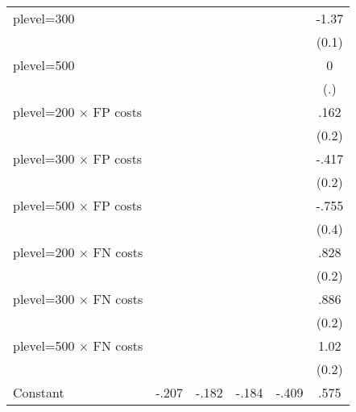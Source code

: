 \begin{table}[htbp]
\begin{tabular}{l*{5}{c}}
plevel=300      &                  &                  &                  &                  &    -1.37\sym{***}\\
                &                  &                  &                  &                  &    (0.1)         \\
plevel=500      &                  &                  &                  &                  &        0         \\
                &                  &                  &                  &                  &      (.)         \\
plevel=200 $\times$ FP costs&                  &                  &                  &                  &     .162         \\
                &                  &                  &                  &                  &    (0.2)         \\
plevel=300 $\times$ FP costs&                  &                  &                  &                  &    -.417\sym{***}\\
                &                  &                  &                  &                  &    (0.2)         \\
plevel=500 $\times$ FP costs&                  &                  &                  &                  &    -.755\sym{*}  \\
                &                  &                  &                  &                  &    (0.4)         \\
plevel=200 $\times$ FN costs&                  &                  &                  &                  &     .828\sym{***}\\
                &                  &                  &                  &                  &    (0.2)         \\
plevel=300 $\times$ FN costs&                  &                  &                  &                  &     .886\sym{***}\\
                &                  &                  &                  &                  &    (0.2)         \\
plevel=500 $\times$ FN costs&                  &                  &                  &                  &     1.02\sym{***}\\
                &                  &                  &                  &                  &    (0.2)         \\
Constant        &    -.207         &    -.182\sym{**} &    -.184\sym{**} &    -.409\sym{***}&     .575\sym{***}\\

\end{tabular}
\end{table}
